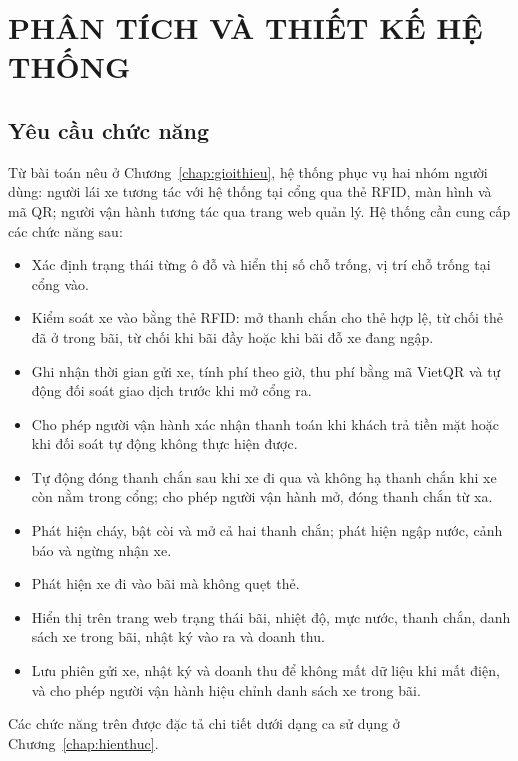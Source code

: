 \chapter{PHÂN TÍCH VÀ THIẾT KẾ HỆ THỐNG}\label{chap:thietke}

\section{Yêu cầu chức năng}\label{sec:yeucau}
Từ bài toán nêu ở Chương~\ref{chap:gioithieu}, hệ thống phục vụ hai nhóm người dùng: người lái
xe tương tác với hệ thống tại cổng qua thẻ RFID, màn hình và mã QR; người vận hành tương tác qua
trang web quản lý. Hệ thống cần cung cấp các chức năng sau:
\begin{itemize}
  \item Xác định trạng thái từng ô đỗ và hiển thị số chỗ trống, vị trí chỗ trống tại cổng vào.
  \item Kiểm soát xe vào bằng thẻ RFID: mở thanh chắn cho thẻ hợp lệ, từ chối thẻ đã ở trong
        bãi, từ chối khi bãi đầy hoặc khi bãi đỗ xe đang ngập.
  \item Ghi nhận thời gian gửi xe, tính phí theo giờ, thu phí bằng mã VietQR và tự động đối soát
        giao dịch trước khi mở cổng ra.
  \item Cho phép người vận hành xác nhận thanh toán khi khách trả tiền mặt hoặc khi đối soát tự
        động không thực hiện được.
  \item Tự động đóng thanh chắn sau khi xe đi qua và không hạ thanh chắn khi xe còn nằm trong
        cổng; cho phép người vận hành mở, đóng thanh chắn từ xa.
  \item Phát hiện cháy, bật còi và mở cả hai thanh chắn; phát hiện ngập nước, cảnh báo và ngừng
        nhận xe.
  \item Phát hiện xe đi vào bãi mà không quẹt thẻ.
  \item Hiển thị trên trang web trạng thái bãi, nhiệt độ, mực nước, thanh chắn, danh sách xe
        trong bãi, nhật ký vào ra và doanh thu.
  \item Lưu phiên gửi xe, nhật ký và doanh thu để không mất dữ liệu khi mất điện, và cho phép
        người vận hành hiệu chỉnh danh sách xe trong bãi.
\end{itemize}

Các chức năng trên được đặc tả chi tiết dưới dạng ca sử dụng ở Chương~\ref{chap:hienthuc}.

